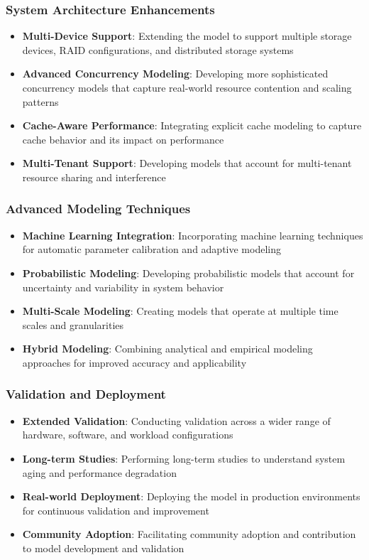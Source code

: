\documentclass[11pt]{article}
\begin{document}
\subsubsection{System Architecture Enhancements}
\begin{itemize}
    \item \textbf{Multi-Device Support}: Extending the model to support multiple storage devices, RAID configurations, and distributed storage systems
    \item \textbf{Advanced Concurrency Modeling}: Developing more sophisticated concurrency models that capture real-world resource contention and scaling patterns
    \item \textbf{Cache-Aware Performance}: Integrating explicit cache modeling to capture cache behavior and its impact on performance
    \item \textbf{Multi-Tenant Support}: Developing models that account for multi-tenant resource sharing and interference
\end{itemize}

\subsubsection{Advanced Modeling Techniques}
\begin{itemize}
    \item \textbf{Machine Learning Integration}: Incorporating machine learning techniques for automatic parameter calibration and adaptive modeling
    \item \textbf{Probabilistic Modeling}: Developing probabilistic models that account for uncertainty and variability in system behavior
    \item \textbf{Multi-Scale Modeling}: Creating models that operate at multiple time scales and granularities
    \item \textbf{Hybrid Modeling}: Combining analytical and empirical modeling approaches for improved accuracy and applicability
\end{itemize}

\subsubsection{Validation and Deployment}
\begin{itemize}
    \item \textbf{Extended Validation}: Conducting validation across a wider range of hardware, software, and workload configurations
    \item \textbf{Long-term Studies}: Performing long-term studies to understand system aging and performance degradation
    \item \textbf{Real-world Deployment}: Deploying the model in production environments for continuous validation and improvement
    \item \textbf{Community Adoption}: Facilitating community adoption and contribution to model development and validation
\end{itemize}
\end{document}
